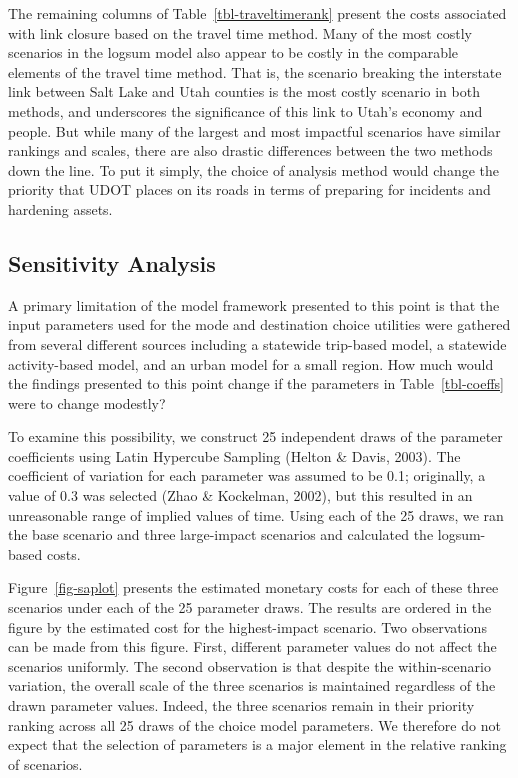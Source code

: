 \documentclass[
  letterpaper,
  number,
  review,
  3p]{elsarticle}
\begin{document}
The remaining columns of Table~\ref{tbl-traveltimerank} present the
costs associated with link closure based on the travel time method. Many
of the most costly scenarios in the logsum model also appear to be
costly in the comparable elements of the travel time method. That is,
the scenario breaking the interstate link between Salt Lake and Utah
counties is the most costly scenario in both methods, and underscores
the significance of this link to Utah's economy and people. But while
many of the largest and most impactful scenarios have similar rankings
and scales, there are also drastic differences between the two methods
down the line. To put it simply, the choice of analysis method would
change the priority that UDOT places on its roads in terms of preparing
for incidents and hardening assets.

\hypertarget{sensitivity-analysis}{%
\subsection{Sensitivity Analysis}\label{sensitivity-analysis}}

A primary limitation of the model framework presented to this point is
that the input parameters used for the mode and destination choice
utilities were gathered from several different sources including a
statewide trip-based model, a statewide activity-based model, and an
urban model for a small region. How much would the findings presented to
this point change if the parameters in Table~\ref{tbl-coeffs} were to
change modestly?

To examine this possibility, we construct 25 independent draws of the
parameter coefficients using Latin Hypercube Sampling (Helton \& Davis,
2003). The coefficient of variation for each parameter was assumed to be
0.1; originally, a value of 0.3 was selected (Zhao \& Kockelman, 2002),
but this resulted in an unreasonable range of implied values of time.
Using each of the 25 draws, we ran the base scenario and three
large-impact scenarios and calculated the logsum-based costs.

Figure~\ref{fig-saplot} presents the estimated monetary costs for each
of these three scenarios under each of the 25 parameter draws. The
results are ordered in the figure by the estimated cost for the
highest-impact scenario. Two observations can be made from this figure.
First, different parameter values do not affect the scenarios uniformly.
The second observation is that despite the within-scenario variation,
the overall scale of the three scenarios is maintained regardless of the
drawn parameter values. Indeed, the three scenarios remain in their
priority ranking across all 25 draws of the choice model parameters. We
therefore do not expect that the selection of parameters is a major
element in the relative ranking of scenarios.
\end{document}
